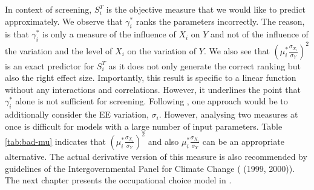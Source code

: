 \noindent
In context of screening, $S_i^T$ is the objective measure that we would like to predict approximately. We observe that $\gamma_i^*$ ranks the parameters incorrectly. The reason, is that $\gamma_i^*$ is only a measure of the influence of $X_i$ on $Y$ and not of the influence of the variation and the level of $X_i$ on the variation of $Y$. We also see that $(\mu_i^* \frac{\sigma_{X_i}}{\sigma_Y})^2$ is an exact predictor for $S_i^T$ as it does not only generate the correct ranking but also the right effect size. Importantly, this result is specific to a linear function without any interactions and correlations. However, it underlines the point that $\gamma_i^*$ alone is not sufficient for screening. Following \cite{ge2017extending}, one approach would be to additionally consider the EE variation, $\sigma_i$. However, analysing two measures at once is difficult for models with a large number of input parameters. Table \ref{tab:bad-mu} indicates that $(\mu_i^* \frac{\sigma_{X_i}}{\sigma_Y})^2$ and also $\mu_i^* \frac{\sigma_{X_i}}{\sigma_Y}$ can be an appropriate alternative. The actual derivative version of this measure is also recommended by guidelines of the Intergovernmental Panel for Climate Change (\citeauthor{ipcc1999} (1999, 2000)).\\



\noindent
The next chapter presents the occupational choice model in \cite{Keane.1994}.


